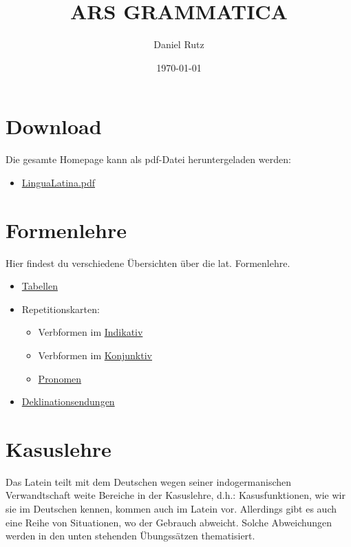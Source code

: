\documentclass{scrartcl}
\author{Daniel Rutz}
\date{\today}
\title{ARS GRAMMATICA}
\begin{document}
\maketitle


\section{Download}
\label{sec:org1694147}
Die gesamte Homepage kann als pdf-Datei heruntergeladen werden:
\begin{itemize}
\item \href{https://www.dropbox.com/s/908xuomar85chqj/LinguaLatinaPdf.pdf?dl=0}{LinguaLatina.pdf}
\end{itemize}

\section{Formenlehre}
\label{sec:orgcdf1440}
Hier findest du verschiedene Übersichten über die lat. 
Formenlehre.

\begin{itemize}
\item \href{https://www.dropbox.com/s/6mg0r0cdojb8uj4/GrammaticaLatina\_Formenlehre.pdf?dl=0}{Tabellen}
\item Repetitionskarten:
\begin{itemize}
\item Verbformen im \href{https://www.dropbox.com/s/nwnbpxhokzbotzx/RepetitionskartenFormellehreLateinIndikativ.pdf?dl=0}{Indikativ}
\item Verbformen im \href{https://www.dropbox.com/s/rew7e8ofvfnxeup/RepetitionskartenFormellehreLateinKonjunktiv.pdf?dl=0}{Konjunktiv}
\item \href{https://www.dropbox.com/s/pxnj7f8e4cacyuv/RepetitionskartenFormellehreLateinPronomina.pdf?dl=0}{Pronomen}
\end{itemize}
\item \href{https://www.dropbox.com/s/gnpg12fmmq5tkj8/Deklinationen\_\%C3\%9Cbersicht\_Gentium.pdf?dl=0}{Deklinationsendungen}
\end{itemize}

\section{Kasuslehre}
\label{sec:orgb5e5aad}
Das Latein teilt mit dem Deutschen wegen seiner indogermanischen
Verwandtschaft weite Bereiche in der Kasuslehre, d.h.:
Kasusfunktionen, wie wir sie im Deutschen kennen, kommen auch im
Latein vor. Allerdings gibt es auch eine Reihe von Situationen, wo der
Gebrauch abweicht. Solche Abweichungen werden in den unten stehenden
Übungssätzen thematisiert. 
\end{document}
